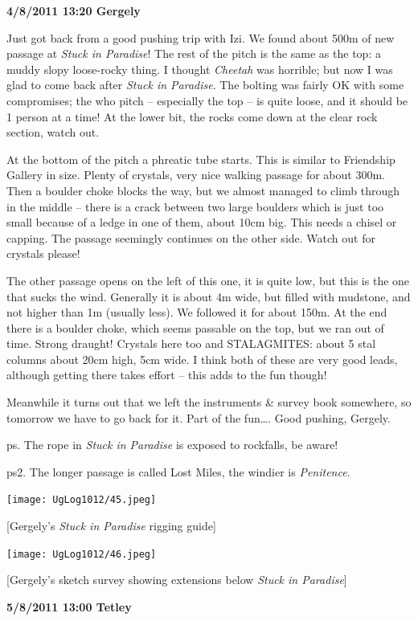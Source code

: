 \textbf{4/8/2011 13:20 Gergely}

Just got back from a good pushing trip with Izi. We found about 500m of
new passage at \emph{Stuck in Paradise}! The rest of the pitch is the
same as the top: a muddy slopy loose-rocky thing. I thought
\emph{Cheetah} was horrible; but now I was glad to come back after
\emph{Stuck in Paradise}. The bolting was fairly OK with some
compromises; the who pitch -- especially the top -- is quite loose, and
it should be 1 person at a time! At the lower bit, the rocks come down
at the clear rock section, watch out.

At the bottom of the pitch a phreatic tube starts. This is similar to
Friendship Gallery in size. Plenty of crystals, very nice walking
passage for about 300m. Then a boulder choke blocks the way, but we
almost managed to climb through in the middle -- there is a crack
between two large boulders which is just too small because of a ledge in
one of them, about 10cm big. This needs a chisel or capping. The passage
seemingly continues on the other side. Watch out for crystals please!

The other passage opens on the left of this one, it is quite low, but
this is the one that sucks the wind. Generally it is about 4m wide, but
filled with mudstone, and not higher than 1m (usually less). We followed
it for about 150m. At the end there is a boulder choke, which seems
passable on the top, but we ran out of time. Strong draught! Crystals
here too and STALAGMITES: about 5 stal columns about 20cm high, 5cm
wide. I think both of these are very good leads, although getting there
takes effort -- this adds to the fun though!

Meanwhile it turns out that we left the instruments \& survey book
somewhere, so tomorrow we have to go back for it. Part of the
fun\ldots{}. Good pushing, Gergely.

ps. The rope in \emph{Stuck in Paradise} is exposed to rockfalls, be
aware!

ps2. The longer passage is called Lost Miles, the windier is
\emph{Penitence}.

\texttt{[image: UgLog1012/45.jpeg]}

{[}Gergely's \emph{Stuck in Paradise} rigging guide{]}

\texttt{[image: UgLog1012/46.jpeg]}

{[}Gergely's sketch survey showing extensions below \emph{Stuck in
Paradise}{]}

\textbf{5/8/2011 13:00 Tetley}

